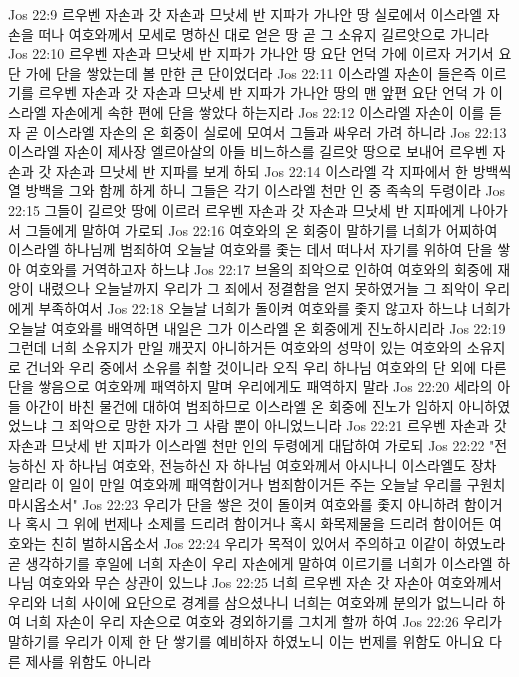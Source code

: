 Jos 22:9  르우벤 자손과 갓 자손과 므낫세 반 지파가 가나안 땅 실로에서 이스라엘 자손을 떠나 여호와께서 모세로 명하신 대로 얻은 땅 곧 그 소유지 길르앗으로 가니라
Jos 22:10  르우벤 자손과 므낫세 반 지파가 가나안 땅 요단 언덕 가에 이르자 거기서 요단 가에 단을 쌓았는데 볼 만한 큰 단이었더라
Jos 22:11  이스라엘 자손이 들은즉 이르기를 르우벤 자손과 갓 자손과 므낫세 반 지파가 가나안 땅의 맨 앞편 요단 언덕 가 이스라엘 자손에게 속한 편에 단을 쌓았다 하는지라
Jos 22:12  이스라엘 자손이 이를 듣자 곧 이스라엘 자손의 온 회중이 실로에 모여서 그들과 싸우러 가려 하니라
Jos 22:13  이스라엘 자손이 제사장 엘르아살의 아들 비느하스를 길르앗 땅으로 보내어 르우벤 자손과 갓 자손과 므낫세 반 지파를 보게 하되
Jos 22:14  이스라엘 각 지파에서 한 방백씩 열 방백을 그와 함께 하게 하니 그들은 각기 이스라엘 천만 인 중 족속의 두령이라
Jos 22:15  그들이 길르앗 땅에 이르러 르우벤 자손과 갓 자손과 므낫세 반 지파에게 나아가서 그들에게 말하여 가로되
Jos 22:16  여호와의 온 회중이 말하기를 너희가 어찌하여 이스라엘 하나님께 범죄하여 오늘날 여호와를 좇는 데서 떠나서 자기를 위하여 단을 쌓아 여호와를 거역하고자 하느냐
Jos 22:17  브올의 죄악으로 인하여 여호와의 회중에 재앙이 내렸으나 오늘날까지 우리가 그 죄에서 정결함을 얻지 못하였거늘 그 죄악이 우리에게 부족하여서
Jos 22:18  오늘날 너희가 돌이켜 여호와를 좇지 않고자 하느냐 너희가 오늘날 여호와를 배역하면 내일은 그가 이스라엘 온 회중에게 진노하시리라
Jos 22:19  그런데 너희 소유지가 만일 깨끗지 아니하거든 여호와의 성막이 있는 여호와의 소유지로 건너와 우리 중에서 소유를 취할 것이니라 오직 우리 하나님 여호와의 단 외에 다른 단을 쌓음으로 여호와께 패역하지 말며 우리에게도 패역하지 말라
Jos 22:20  세라의 아들 아간이 바친 물건에 대하여 범죄하므로 이스라엘 온 회중에 진노가 임하지 아니하였었느냐 그 죄악으로 망한 자가 그 사람 뿐이 아니었느니라
Jos 22:21  르우벤 자손과 갓 자손과 므낫세 반 지파가 이스라엘 천만 인의 두령에게 대답하여 가로되
Jos 22:22  "전능하신 자 하나님 여호와, 전능하신 자 하나님 여호와께서 아시나니 이스라엘도 장차 알리라 이 일이 만일 여호와께 패역함이거나 범죄함이거든 주는 오늘날 우리를 구원치 마시옵소서"
Jos 22:23  우리가 단을 쌓은 것이 돌이켜 여호와를 좇지 아니하려 함이거나 혹시 그 위에 번제나 소제를 드리려 함이거나 혹시 화목제물을 드리려 함이어든 여호와는 친히 벌하시옵소서
Jos 22:24  우리가 목적이 있어서 주의하고 이같이 하였노라 곧 생각하기를 후일에 너희 자손이 우리 자손에게 말하여 이르기를 너희가 이스라엘 하나님 여호와와 무슨 상관이 있느냐
Jos 22:25  너희 르우벤 자손 갓 자손아 여호와께서 우리와 너희 사이에 요단으로 경계를 삼으셨나니 너희는 여호와께 분의가 없느니라 하여 너희 자손이 우리 자손으로 여호와 경외하기를 그치게 할까 하여
Jos 22:26  우리가 말하기를 우리가 이제 한 단 쌓기를 예비하자 하였노니 이는 번제를 위함도 아니요 다른 제사를 위함도 아니라

